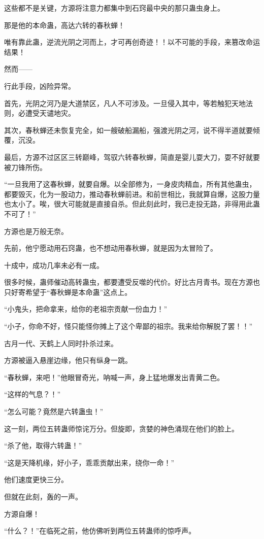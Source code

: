 \begin{this_body}
这些都不是关键，方源将注意力都集中到石窍最中央的那只蛊虫身上。

那是他的本命蛊，高达六转的春秋蝉！

唯有靠此蛊，逆流光阴之河而上，才可再创奇迹！！以不可能的手段，来篡改命运结果！

然而——

行此手段，凶险异常。

首先，光阴之河乃是大道禁区，凡人不可涉及。一旦侵入其中，等若触犯天地法则，必遭受天谴地灾。

其次，春秋蝉还未恢复完全，如一艘破船漏船，强渡光阴之河，说不得半道就要倾覆，沉没。

最后，方源不过区区三转巅峰，驾驭六转春秋蝉，简直是婴儿耍大刀，耍不好就要被刀锋所伤。

“一旦我用了这春秋蝉，就要自爆。以全部修为，一身皮肉精血，所有其他蛊虫，都要毁灭，化为一股动力，推动春秋蝉前进。和前世相比，我就算自爆，这股力量也太小了。唉，很大可能就是直接自杀。但此刻此时，我已走投无路，非得用此蛊不可了！”

方源也是万般无奈。

先前，他宁愿动用石窍蛊，也不想动用春秋蝉，就是因为太冒险了。

十成中，成功几率未必有一成。

很多时候，蛊师催动高转蛊虫，都要遭受反噬的代价。好比古月青书。现在方源也只好寄希望于“春秋蝉是本命蛊”这点上。

“小鬼头，把命拿来，给你的老祖宗贡献一份血力！”

“小子，你命不好，怪只能怪你摊上了这个卑鄙的祖宗。我来给你解脱了罢！！”

古月一代、天鹤上人同时扑杀过来。

方源被逼入悬崖边缘，他只有纵身一跳。

“春秋蝉，来吧！”他眼冒奇光，呐喊一声，身上猛地爆发出青黄二色。

“这样的气息？！”

“怎么可能？竟然是六转蛊虫！”

这一刻，两位五转蛊师惊诧万分。但旋即，贪婪的神色涌现在他们的脸上。

“杀了他，取得六转蛊！”

“这是天降机缘，好小子，乖乖贡献出来，绕你一命！”

他们速度更快三分。

但就在此刻，轰的一声。

方源自爆！

“什么？！”在临死之前，他仿佛听到两位五转蛊师的惊呼声。


\end{this_body}
